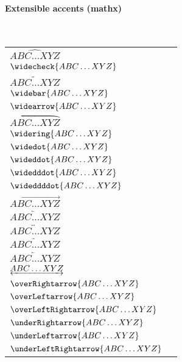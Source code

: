 \documentclass{article}
\def\testaccl#1{$#1{ABC\ldots XYZ}$ & \texttt{\string#1}\\}
\newenvironment{tests}{\mbox{ }\par\noindent\begin{tabular}{ll}}{\end{tabular}}
\begin{document}
\paragraph{Extensible accents (mathx)}
\begin{tests}%
\testaccl{\widehat}
\testaccl{\widecheck}
\testaccl{\widetilde}
\testaccl{\widebar}
\testaccl{\widearrow}
\testaccl{\wideparen}
\testaccl{\widering}
\testaccl{\widedot}
\testaccl{\wideddot}
\testaccl{\widedddot}
\testaccl{\wideddddot}
\testaccl\overrightarrow
\testaccl\overleftarrow
\testaccl\overleftrightarrow
\testaccl\underrightarrow
\testaccl\underleftarrow
\testaccl\underleftrightarrow
\testaccl\overRightarrow
\testaccl\overLeftarrow
\testaccl\overLeftRightarrow
\testaccl\underRightarrow
\testaccl\underLeftarrow
\testaccl\underLeftRightarrow
\end{tests}
\end{document}
